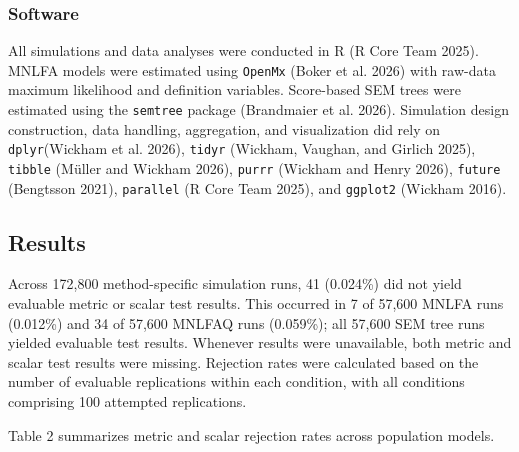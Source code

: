 \documentclass[
  man,
  floatsintext]{apa7}
\begin{document}
\subsubsection{Software}\label{software}

All simulations and data analyses were conducted in R (R Core Team
2025). MNLFA models were estimated using \texttt{OpenMx} (Boker et al.
2026) with raw-data maximum likelihood and definition variables.
Score-based SEM trees were estimated using the \texttt{semtree} package
(Brandmaier et al. 2026). Simulation design construction, data handling,
aggregation, and visualization did rely on \texttt{dplyr}(Wickham et al.
2026), \texttt{tidyr} (Wickham, Vaughan, and Girlich 2025),
\texttt{tibble} (Müller and Wickham 2026), \texttt{purrr} (Wickham and
Henry 2026), \texttt{future} (Bengtsson 2021), \texttt{parallel} (R Core
Team 2025), and \texttt{ggplot2} (Wickham 2016).

\subsection{Results}\label{results}

Across 172,800 method-specific simulation runs, 41 (0.024\%) did not
yield evaluable metric or scalar test results. This occurred in 7 of
57,600 MNLFA runs (0.012\%) and 34 of 57,600 MNLFAQ runs (0.059\%); all
57,600 SEM tree runs yielded evaluable test results. Whenever results
were unavailable, both metric and scalar test results were missing.
Rejection rates were calculated based on the number of evaluable
replications within each condition, with all conditions comprising 100
attempted replications.

Table 2 summarizes metric and scalar rejection rates across population
models.
\end{document}

